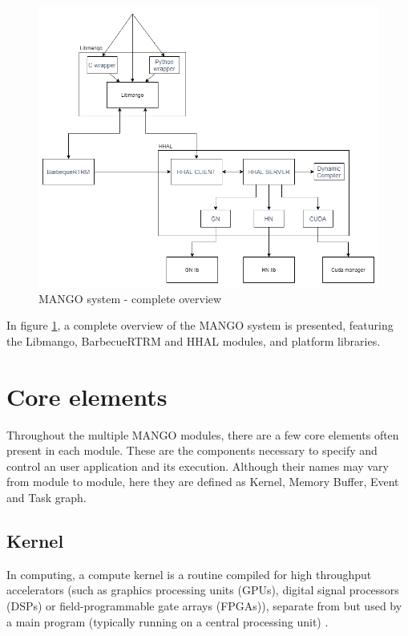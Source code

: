 \begin{figure}[ht]
    \centering
    \includegraphics[width=\textwidth]{img/architecture.png}
    \captionsetup{justification=centering}
    \caption{MANGO system - complete overview}
    \label{fig:mango_system_overview}
\end{figure}

In figure \ref{fig:mango_system_overview}, a complete overview of the MANGO system is presented, featuring the Libmango, BarbecueRTRM and HHAL modules, and platform libraries.

\section{Core elements}
Throughout the multiple MANGO modules, there are a few core elements often present in each module. These are the components necessary to specify and control an user application and its execution. Although their names may vary from module to module, here they are defined as Kernel, Memory Buffer, Event and Task graph.

\subsection{Kernel}
In computing, a compute kernel is a routine compiled for high throughput accelerators (such as graphics processing units (GPUs), digital signal processors (DSPs) or field-programmable gate arrays (FPGAs)), separate from but used by a main program (typically running on a central processing unit) \cite{kernel_wikipedia}. 

